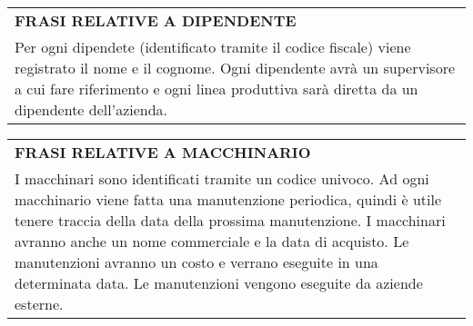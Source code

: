 \begin{center}
	\begin{tabular}{P{16cm}}
		\toprule
		 \textbf {\large {FRASI RELATIVE A DIPENDENTE}} \\
		Per ogni dipendete (identificato tramite il codice fiscale) viene registrato il nome e il cognome. Ogni dipendente avrà un supervisore a cui fare riferimento e ogni linea produttiva sarà diretta da un dipendente dell'azienda.\\
		\bottomrule
	\end{tabular}
	
	\vspace{0.5cm}
	
	\begin{tabular}{P{16cm}}
		\toprule
		 \textbf {\large {FRASI RELATIVE A MACCHINARIO}} \\
		I macchinari sono identificati tramite un codice univoco. Ad ogni macchinario viene fatta una manutenzione periodica, quindi è utile tenere traccia della data della prossima manutenzione. I macchinari avranno anche un nome commerciale e la data di acquisto. Le manutenzioni avranno un costo e verrano eseguite in una determinata data. Le manutenzioni vengono eseguite da aziende esterne.\\
		\bottomrule
	\end{tabular}
	
\end{center}